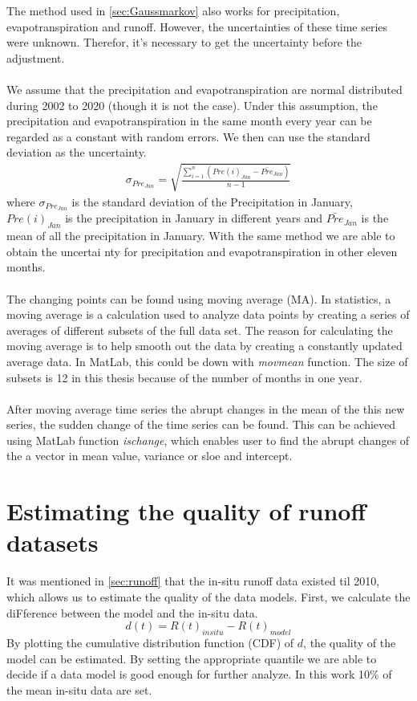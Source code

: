 The method used in \autoref{sec:Gaussmarkov} also works for precipitation, evapotranspiration and runoff. However, the uncertainties of these time series were unknown. Therefor, it's necessary to get the uncertainty before the adjustment. \\\\
We assume that the precipitation and evapotranspiration are normal distributed during 2002 to 2020 (though it is not the case). Under this assumption, the precipitation and evapotranspiration in the same month every year can be regarded as a constant with random errors. We then can use the standard deviation as the uncertainty.
\begin{gather}
\sigma_{Pre_{Jan}} = \sqrt{\frac{\sum_{i=1}^{n} (Pre(i)_{Jan} - \bar{Pre}_{Jan})}{n-1}}
\end{gather}
where $\sigma_{Pre_{Jan}}$ is the standard deviation of the Precipitation in January, $Pre(i)_{Jan}$ is the precipitation in January in different years and $\bar{Pre}_{Jan}$ is the mean of all the precipitation in January. With the same method we are able to obtain the uncertai nty for precipitation and evapotranspiration in other eleven months. \\\\
The changing points can be found using moving average (MA). In statistics, a moving average is a calculation used to analyze data points by creating a series of averages of different subsets of the full data set. The reason for calculating the moving average is to help smooth out the data by creating a constantly updated average data. In MatLab, this could be down with \textit{movmean} function. The size of subsets is 12 in this thesis because of the number of months in one year.\\\\
After moving average time series the abrupt changes in the mean of the this new series, the sudden change of the time series can be found. This can be achieved using MatLab function \textit{ischange}, which enables user to find the abrupt changes of the a vector in mean value, variance or sloe and intercept. 
\section{Estimating the quality of runoff datasets}\label{sec:runoffdata}
It was mentioned in \autoref{sec:runoff} that the in-situ runoff data existed til 2010, which allows us to estimate the quality of the data models. First, we calculate the diFference between the model and the in-situ data.
\begin{equation}
	d(t) = R(t)_{insitu} - R(t)_{model}
\end{equation}
By plotting the cumulative distribution function (CDF) of $d$, the quality of the model can be estimated. By setting the appropriate quantile we are able to decide if a data model is good enough for further analyze. In this work 10\% of the mean in-situ data are set.  
